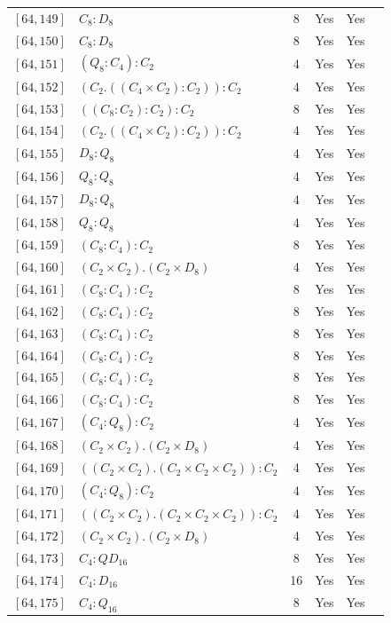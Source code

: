 \documentclass[12pt, a4paper]{article}
\theoremstyle{plain}
\theoremstyle{definition}
\begin{document}
\begin{longtable}{llcccl}
  $[64,149]$ & $C_8 : D_8$ & 8 & Yes & Yes \\
  $[64,150]$ & $C_8 : D_8$ & 8 & Yes & Yes \\
  $[64,151]$ & $(Q_8 : C_4) : C_2$ & 4 & Yes & Yes \\
  $[64,152]$ & $(C_2 . ((C_4 \times C_2) : C_2)) : C_2$ & 4 & Yes & Yes \\
  $[64,153]$ & $((C_8 : C_2) : C_2) : C_2$ & 8 & Yes & Yes \\
  $[64,154]$ & $(C_2 . ((C_4 \times C_2) : C_2)) : C_2$ & 4 & Yes & Yes \\
  $[64,155]$ & $D_8 : Q_8$ & 4 & Yes & Yes \\
  $[64,156]$ & $Q_8 : Q_8$ & 4 & Yes & Yes \\
  $[64,157]$ & $D_8 : Q_8$ & 4 & Yes & Yes \\
  $[64,158]$ & $Q_8 : Q_8$ & 4 & Yes & Yes \\
  $[64,159]$ & $(C_8 : C_4) : C_2$ & 8 & Yes & Yes \\
  $[64,160]$ & $(C_2 \times C_2) . (C_2 \times D_8)$ & 4 & Yes & Yes \\
  $[64,161]$ & $(C_8 : C_4) : C_2$ & 8 & Yes & Yes \\
  $[64,162]$ & $(C_8 : C_4) : C_2$ & 8 & Yes & Yes \\
  $[64,163]$ & $(C_8 : C_4) : C_2$ & 8 & Yes & Yes \\
  $[64,164]$ & $(C_8 : C_4) : C_2$ & 8 & Yes & Yes \\
  $[64,165]$ & $(C_8 : C_4) : C_2$ & 8 & Yes & Yes \\
  $[64,166]$ & $(C_8 : C_4) : C_2$ & 8 & Yes & Yes \\
  $[64,167]$ & $(C_4 : Q_8) : C_2$ & 4 & Yes & Yes \\
  $[64,168]$ & $(C_2 \times C_2) . (C_2 \times D_8)$ & 4 & Yes & Yes \\
  $[64,169]$ & $((C_2 \times C_2) . (C_2 \times C_2 \times C_2)) : C_2$ & 4 & Yes & Yes \\
  $[64,170]$ & $(C_4 : Q_8) : C_2$ & 4 & Yes & Yes \\
  $[64,171]$ & $((C_2 \times C_2) . (C_2 \times C_2 \times C_2)) : C_2$ & 4 & Yes & Yes \\
  $[64,172]$ & $(C_2 \times C_2) . (C_2 \times D_8)$ & 4 & Yes & Yes \\
  $[64,173]$ & $C_4 : QD_{16}$ & 8 & Yes & Yes \\
  $[64,174]$ & $C_4 : D_{16}$ & 16 & Yes & Yes \\
  $[64,175]$ & $C_4 : Q_{16}$ & 8 & Yes & Yes \\

\end{longtable}
\end{document}
